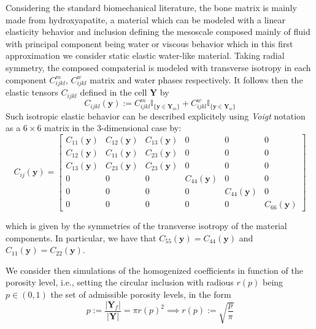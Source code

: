 Considering the standard biomechanical literature, the bone matrix is mainly made from hydroxyapatite, a material which can be modeled with a linear elasticity behavior and inclusion defining the mesoscale composed mainly of fluid with principal component being water or viscous behavior which in this first approximation we consider static elastic water-like material. Taking radial symmetry, the composed compaterial is modeled with transverse isotropy in each component $C^m_{ijkl}$, $C^w_{ijkl}$ matrix and water phases respectively.
It follows then the elastic tensors $C_{ijkl}$ defined in the cell $\mathbf{Y}$ by
\begin{equation*}
    C_{ijkl} (\mathbf{y}) := C^m_{ijkl} \mathbb{I}_{\{\mathbf{y} \in  \mathbf{Y}_{m}\}} + C^w_{ijkl} \mathbb{I}_{\{ \mathbf{y} \in \mathbf{Y}_{w}\}}
\end{equation*}
Such isotropic elastic behavior can be described explicitely using \textit{Voigt} notation as a $6\times 6$ matrix in the 3-dimensional case by:
\begin{equation*}
    C_{ij}(\mathbf{y}) = 
    \begin{bmatrix}
    C_{11}(\mathbf{y}) & C_{12}(\mathbf{y}) & C_{13}(\mathbf{y}) & 0 & 0 & 0 \\
    C_{12}(\mathbf{y}) & C_{11}(\mathbf{y}) & C_{23}(\mathbf{y}) & 0 & 0 & 0 \\
    C_{13}(\mathbf{y}) & C_{23}(\mathbf{y}) & C_{23}(\mathbf{y}) & 0 & 0 & 0 \\
    0 & 0 & 0 & C_{44}(\mathbf{y}) & 0 & 0 \\
    0 & 0 & 0 & 0 & C_{44}(\mathbf{y}) & 0 \\
    0 & 0 & 0 & 0 & 0 & C_{66}(\mathbf{y}) 
    \end{bmatrix}
\end{equation*}

which is given by the symmetries of the transverse isotropy of the material components. In particular, we have that $C_{55}(\mathbf{y}) = C_{44}(\mathbf{y})$ and $C_{11}(\mathbf{y}) = C_{22}(\mathbf{y})$.

We consider then simulations of the homogenized coefficients in function of the porosity level, i.e., setting the circular inclusion with radious $r(p)$ being $p \in (0,1)$ the set of admissible porosity levels, in the form 
\begin{equation*}
    p := \frac{\vert \mathbf{Y}_f \vert }{\vert \mathbf{Y}\vert} = \pi r(p)^2 \implies r(p) := \sqrt{\frac{p}{\pi}}
\end{equation*}

